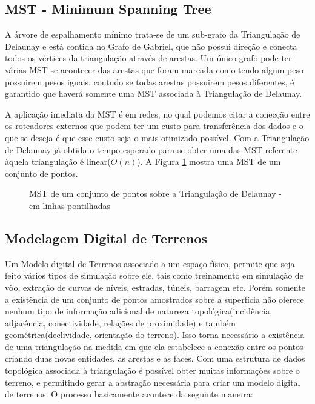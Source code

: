 \documentclass[12pt,a4paper]{book}
\begin{document}
\subsection{MST - Minimum Spanning Tree}

A \'arvore de espalhamento m\'inimo trata-se de um sub-grafo da Triangula\c{c}\~{a}o de Delaunay e est\'a contida no Grafo de Gabriel, que n\~ao possui dire\c{c}\~{a}o e conecta todos os v\'ertices da triangula\c{c}\~{a}o atrav\'es de arestas. Um \'unico grafo pode ter v\'arias MST se acontecer das arestas que foram marcada como tendo algum peso possuirem pesos iguais, contudo se todas arestas possuirem pesos diferentes, \'e garantido que haver\'a somente uma MST associada \`a Triangula\c{c}\~{a}o de Delaunay.

A aplica\c{c}\~{a}o imediata da MST \'e em redes, no qual podemos citar a conec\c{c}\~{a}o entre os roteadores externos que podem ter um custo para transfer\^encia dos dados e o que se deseja \'e que esse custo seja o mais otimizado poss\'ivel. Com a Triangula\c{c}\~{a}o de Delaunay j\'a obtida o tempo esperado para se obter uma das MST referente \`aquela triangula\c{c}\~{a}o \'e linear($O(n)$). A Figura \ref{fig_mst1} mostra uma MST de um conjunto de pontos.
 
\begin{figure}[htbp]
  \begin{center}
    \leavevmode
     
    \caption{MST de um conjunto de pontos sobre a Triangula\c{c}\~{a}o de Delaunay - em linhas pontilhadas}
    \label{fig_mst1}
  \end{center}
\end{figure}


\subsection{Modelagem Digital de Terrenos}

Um Modelo digital de Terrenos associado a um espa\c{c}o f\'isico, permite que seja feito v\'arios tipos de simula\c{c}\~{a}o sobre ele, tais como treinamento em simula\c{c}\~{a}o de v\^oo, extra\c{c}\~{a}o de curvas de n\'iveis, estradas, t\'uneis, barragem etc. Por\'em somente a exist\^encia de um conjunto de pontos amostrados sobre a superf\'icia n\~ao oferece nenhum tipo de informa\c{c}\~{a}o adicional de natureza topol\'ogica(incid\^encia, adjac\^encia, conectividade, rela\c{c}\~{o}es de proximidade) e tamb\'em geom\'etrica(declividade, orienta\c{c}\~{a}o do terreno). Isso torna necess\'ario a exist\^encia de uma triangula\c{c}\~{a}o na medida em que ela estabelece a conex\~ao entre os pontos criando duas novas entidades, as arestas e as faces. Com uma estrutura de dados topol\'ogica associada \`a triangula\c{c}\~{a}o \'e poss\'ivel obter muitas informa\c{c}\~{o}es sobre o terreno, e permitindo gerar a abstra\c{c}\~{a}o necess\'aria para criar um modelo digital de terrenos. O processo basicamente acontece da seguinte maneira:
\end{document}
